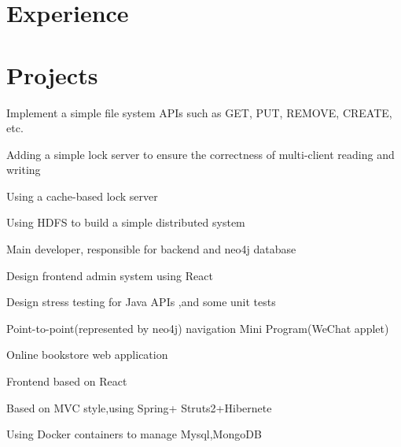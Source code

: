 \documentclass[]{deedy-resume-openfont}
\begin{document}
\begin{minipage}[t]{0.68\textwidth} 


\section{Experience}
\sectionsep
{}
\sectionsep






\section{Projects}
\sectionsep

\vspace{\topsep}
\begin{tightemize}
    \item Implement a simple file system APIs such as GET, PUT, REMOVE, CREATE, etc.
    \item Adding a simple lock server to ensure the correctness of multi-client reading and writing
    \item Using a cache-based lock server 
    \item Using HDFS to build a simple distributed system
\end{tightemize}
\sectionsep

\begin{tightemize}
    \item Main developer, responsible for backend and neo4j database
    \item Design frontend admin system using React
    \item Design stress testing for Java APIs ,and some unit tests
    \item Point-to-point(represented by neo4j) navigation Mini Program(WeChat applet)
\end{tightemize}
\sectionsep

\begin{tightemize}
    \item Online bookstore web application
    \item Frontend based on React 
    \item Based on MVC style,using Spring+ Struts2+Hibernete
    \item Using Docker containers to manage Mysql,MongoDB
\end{tightemize}
\sectionsep


\end{minipage}
\end{document}
